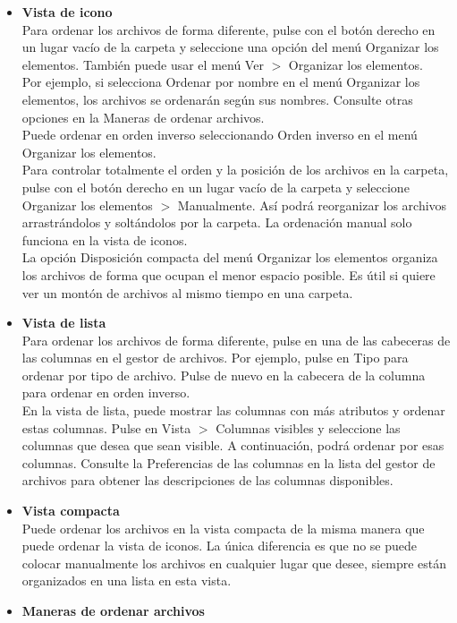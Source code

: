 \begin{itemize}
\item {\bf Vista de icono}\\
Para ordenar los archivos de forma diferente, pulse con el botón derecho en un lugar vacío de la carpeta y seleccione una opción del menú Organizar los elementos. También puede usar el menú Ver $>$ Organizar los elementos.\\
Por ejemplo, si selecciona Ordenar por nombre en el menú Organizar los elementos, los archivos se ordenarán según sus nombres. Consulte otras opciones en la Maneras de ordenar archivos.\\

Puede ordenar en orden inverso seleccionando Orden inverso en el menú Organizar los elementos.\\
Para controlar totalmente el orden y la posición de los archivos en la carpeta, pulse con el botón derecho en un lugar vacío de la carpeta y seleccione Organizar los elementos $>$ Manualmente. Así podrá reorganizar los archivos arrastrándolos y soltándolos por la carpeta. La ordenación manual solo funciona en la vista de iconos.\\
La opción Disposición compacta del menú Organizar los elementos organiza los archivos de forma que ocupan el menor espacio posible. Es útil si quiere ver un montón de archivos al mismo tiempo en una carpeta.
\item {\bf Vista de lista}\\ Para ordenar los archivos de forma diferente, pulse en una de las cabeceras de las columnas en el gestor de archivos. Por ejemplo, pulse en Tipo para ordenar por tipo de archivo. Pulse de nuevo en la cabecera de la columna para ordenar en orden inverso.\\
En la vista de lista, puede mostrar las columnas con más atributos y ordenar estas columnas. Pulse en Vista $>$ Columnas visibles y seleccione las columnas que desea que sean visible. A continuación, podrá ordenar por esas columnas. Consulte la Preferencias de las columnas en la lista del gestor de archivos para obtener las descripciones de las columnas disponibles.
\item {\bf Vista compacta}\\ Puede ordenar los archivos en la vista compacta de la misma manera que puede ordenar la vista de iconos. La única diferencia es que no se puede colocar manualmente los archivos en cualquier lugar que desee, siempre están organizados en una lista en esta vista.
\item {\bf Maneras de ordenar archivos}\\

\end{itemize}
